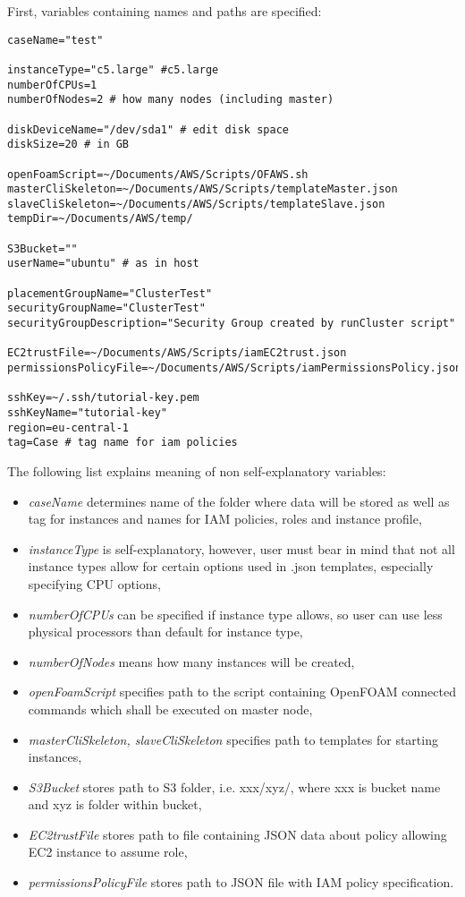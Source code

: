 \documentclass[11pt,english]{article}
\begin{document}
First, variables containing names and paths are specified:
\begin{lstlisting}
caseName="test"

instanceType="c5.large" #c5.large
numberOfCPUs=1
numberOfNodes=2 # how many nodes (including master)

diskDeviceName="/dev/sda1" # edit disk space
diskSize=20 # in GB

openFoamScript=~/Documents/AWS/Scripts/OFAWS.sh
masterCliSkeleton=~/Documents/AWS/Scripts/templateMaster.json
slaveCliSkeleton=~/Documents/AWS/Scripts/templateSlave.json
tempDir=~/Documents/AWS/temp/

S3Bucket=""
userName="ubuntu" # as in host

placementGroupName="ClusterTest"
securityGroupName="ClusterTest"
securityGroupDescription="Security Group created by runCluster script"

EC2trustFile=~/Documents/AWS/Scripts/iamEC2trust.json
permissionsPolicyFile=~/Documents/AWS/Scripts/iamPermissionsPolicy.json

sshKey=~/.ssh/tutorial-key.pem
sshKeyName="tutorial-key"
region=eu-central-1
tag=Case # tag name for iam policies
\end{lstlisting}
The following list explains meaning of non self-explanatory variables:
\begin{itemize}
	\item \textit{caseName} determines name of the folder where data will be stored as well as tag for instances and names for IAM policies, roles and instance profile,
	\item \textit{instanceType} is self-explanatory, however, user must bear in mind that not all instance types allow for certain options used in .json templates, especially specifying CPU options,
	\item \textit{numberOfCPUs} can be specified if instance type allows, so user can use less physical processors than default for instance type,
	\item \textit{numberOfNodes} means how many instances will be created,
	\item \textit{openFoamScript} specifies path to the script containing OpenFOAM connected commands which shall be executed on master node,
	\item \textit{masterCliSkeleton, slaveCliSkeleton} specifies path to templates for starting instances,
	\item \textit{S3Bucket} stores path to S3 folder, i.e. xxx/xyz/, where xxx is bucket name and xyz is folder within bucket,
	\item \textit{EC2trustFile} stores path to file containing JSON data about policy allowing EC2 instance to assume role,
	\item \textit{permissionsPolicyFile} stores path to JSON file with IAM policy specification.
\end{itemize}
\end{document}
